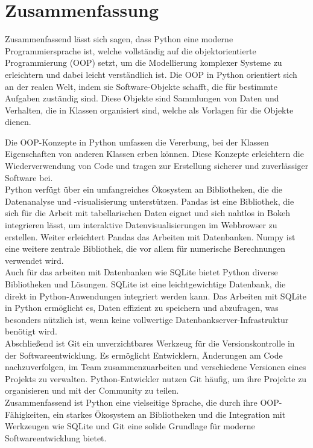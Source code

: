 \chapter{Zusammenfassung}


Zusammenfassend lässt sich sagen, dass Python eine moderne Programmiersprache ist, welche vollständig auf die objektorientierte Programmierung (OOP) setzt, um die Modellierung komplexer Systeme zu erleichtern und dabei leicht verständlich ist. Die OOP in Python orientiert sich an der realen Welt, indem sie Software-Objekte schafft, die für bestimmte Aufgaben zuständig sind. Diese Objekte sind Sammlungen von Daten und Verhalten, die in Klassen organisiert sind, welche als Vorlagen für die Objekte dienen. 

Die OOP-Konzepte in Python umfassen die Vererbung, bei der Klassen Eigenschaften von anderen Klassen erben können. Diese Konzepte erleichtern die Wiederverwendung von Code und tragen zur Erstellung sicherer und zuverlässiger Software bei.\\


Python verfügt über ein umfangreiches Ökosystem an Bibliotheken, die die Datenanalyse und -visualisierung unterstützen. Pandas ist eine Bibliothek, die sich für die Arbeit mit tabellarischen Daten eignet und sich nahtlos in Bokeh integrieren lässt, um interaktive Datenvisualisierungen im Webbrowser zu erstellen. Weiter erleichtert Pandas das Arbeiten mit Datenbanken. 
Numpy ist eine weitere zentrale Bibliothek, die vor allem für numerische Berechnungen verwendet wird. \\

Auch für das arbeiten mit Datenbanken wie SQLite bietet Python diverse Bibliotheken und Lösungen. SQLite ist eine leichtgewichtige Datenbank, die direkt in Python-Anwendungen integriert werden kann. Das Arbeiten mit SQLite in Python ermöglicht es, Daten effizient zu speichern und abzufragen, was besonders nützlich ist, wenn keine vollwertige Datenbankserver-Infrastruktur benötigt wird.\\

Abschließend ist Git ein unverzichtbares Werkzeug für die Versionskontrolle in der Softwareentwicklung. Es ermöglicht Entwicklern, Änderungen am Code nachzuverfolgen, im Team zusammenzuarbeiten und verschiedene Versionen eines Projekts zu verwalten. Python-Entwickler nutzen Git häufig, um ihre Projekte zu organisieren und mit der Community zu teilen.\\

Zusammenfassend ist Python eine vielseitige Sprache, die durch ihre OOP-Fähigkeiten, ein starkes Ökosystem an Bibliotheken und die Integration mit Werkzeugen wie SQLite und Git eine solide Grundlage für moderne Softwareentwicklung bietet.